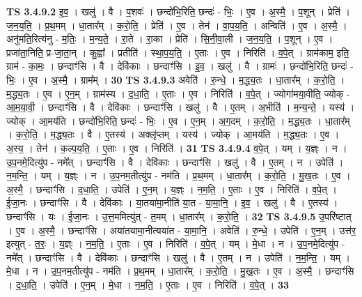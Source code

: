 \documentclass[17pt]{extarticle}
\begin{document}
                  \newline
                                \textbf{ TS 3.4.9.2} \newline
                  इ॒व॒ । खलु॑ । वै । प॒शवः॑ । छन्दो॑भि॒रिति॒ छन्दः॑ - भिः॒ । ए॒व । अ॒स्मै॒ । प॒शून् । प्रेति॑ । ज॒न॒य॒ति॒ । प्र॒थ॒मम् । धा॒तार᳚म् । क॒रो॒ति॒ । प्रेति॑ । ए॒व । तेन॑ । वा॒प॒य॒ति॒ । अन्विति॑ । ए॒व । अ॒स्मै॒ । अनु॑मति॒रित्य॑नु - म॒तिः॒ । म॒न्य॒ते॒ । रा॒ते । रा॒का । प्रेति॑ । सि॒नी॒वा॒ली । ज॒न॒य॒ति॒ । प॒शून् । ए॒व । प्रजा॑ता॒निति॒ प्र-जा॒ता॒न् । कु॒ह्वा᳚ । प्रतीति॑ । स्था॒प॒य॒ति॒ । ए॒ताः । ए॒व । निरिति॑ । व॒पे॒त् । ग्राम॑काम॒ इति॒ ग्राम॑ - का॒मः॒ । छन्दाꣳ॑सि । वै । देवि॑काः । छन्दाꣳ॑सि । इ॒व॒ । खलु॑ । वै । ग्रामः॑ । छन्दो॑भि॒रिति॒ छन्दः॑ - भिः॒ । ए॒व । अ॒स्मै॒ । ग्राम᳚म् । \textbf{  30} \newline
                  \newline
                                \textbf{ TS 3.4.9.3} \newline
                  अवेति॑ । रु॒न्धे॒ । म॒द्ध्य॒तः । धा॒तार᳚म् । क॒रो॒ति॒ । म॒द्ध्य॒तः । ए॒व । ए॒न॒म् । ग्राम॑स्य । द॒धा॒ति॒ । ए॒ताः । ए॒व । निरिति॑ । व॒पे॒त् । ज्योगा॑मया॒वीति॒ ज्योक् - आ॒म॒या॒वी॒ । छन्दाꣳ॑सि । वै । देवि॑काः । छन्दाꣳ॑सि । खलु॑ । वै । ए॒तम् । अ॒भीति॑ । म॒न्य॒न्ते॒ । यस्य॑ । ज्योक् । आ॒मय॑ति । छन्दो॑भि॒रिति॒ छन्दः॑ - भिः॒ । ए॒व । ए॒न॒म् । अ॒ग॒दम् । क॒रो॒ति॒ । म॒द्ध्य॒तः । धा॒तार᳚म् । क॒रो॒ति॒ । म॒द्ध्य॒तः । वै । ए॒तस्य॑ । अक्लृ॑प्तम् । यस्य॑ । ज्योक् । आ॒मय॑ति । म॒द्ध्य॒तः । ए॒व । अ॒स्य॒ । तेन॑ । क॒ल्प॒य॒ति॒ । ए॒ताः । ए॒व । निरिति॑ । \textbf{  31} \newline
                  \newline
                                \textbf{ TS 3.4.9.4} \newline
                  व॒पे॒त् । यम् । य॒ज्ञ्ः । न । उ॒प॒नमे॒दित्यु॑प - नमे᳚त् । छन्दाꣳ॑सि । वै । देवि॑काः । छन्दाꣳ॑सि । खलु॑ । वै । ए॒तम् । न । उपेति॑ । न॒म॒न्ति॒ । यम् । य॒ज्ञ्ः । न । उ॒प॒नम॒तीत्यु॑प - नम॑ति । प्र॒थ॒मम् । धा॒तार᳚म् । क॒रो॒ति॒ । मु॒ख॒तः । ए॒व । अ॒स्मै॒ । छन्दाꣳ॑सि । द॒धा॒ति॒ । उपेति॑ । ए॒न॒म् । य॒ज्ञ्ः । न॒म॒ति॒ । ए॒ताः । ए॒व । निरिति॑ । व॒पे॒त् । ई॒जा॒नः । छन्दाꣳ॑सि । वै । देवि॑काः । या॒तया॑मा॒नीति॑ या॒त - या॒मा॒नि॒ । इ॒व॒ । खलु॑ । वै । ए॒तस्य॑ । छन्दाꣳ॑सि । यः । ई॒जा॒नः । उ॒त्त॒ममित्यु॑त् - त॒मम् । धा॒तार᳚म् । क॒रो॒ति॒ । \textbf{  32} \newline
                  \newline
                                \textbf{ TS 3.4.9.5} \newline
                  उ॒परि॑ष्टात् । ए॒व । अ॒स्मै॒ । छन्दाꣳ॑सि । अया॑तयामा॒नीत्यया॑त - या॒मा॒नि॒ । अवेति॑ । रु॒न्धे॒ । उपेति॑ । ए॒न॒म् । उत्त॑र॒ इत्युत् - त॒रः॒ । य॒ज्ञ्ः । न॒म॒ति॒ । ए॒ताः । ए॒व । निरिति॑ । व॒पे॒त् । यम् । मे॒धा । न । उ॒प॒नमे॒दित्यु॑प - नमे᳚त् । छन्दाꣳ॑सि । वै । देवि॑काः । छन्दाꣳ॑सि । खलु॑ । वै । ए॒तम् । न । उपेति॑ । न॒म॒न्ति॒ । यम् । मे॒धा । न । उ॒प॒नम॒तीत्यु॑प - नम॑ति । प्र॒थ॒मम् । धा॒तार᳚म् । क॒रो॒ति॒ । मु॒ख॒तः । ए॒व । अ॒स्मै॒ । छन्दाꣳ॑सि । द॒धा॒ति॒ । उपेति॑ । ए॒न॒म् । मे॒धा । न॒म॒ति॒ । ए॒ताः । ए॒व । निरिति॑ । व॒पे॒त् । \textbf{  33} \newline
\end{document}
